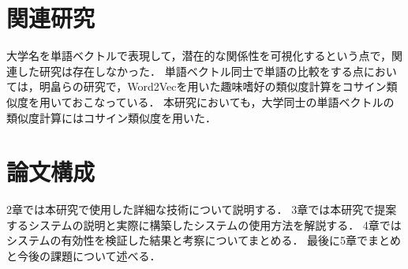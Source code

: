 \section{関連研究}
大学名を単語ベクトルで表現して，潜在的な関係性を可視化するという点で，関連した研究は存在しなかった．
単語ベクトル同士で単語の比較をする点においては，明畠ら\cite{thesis1}の研究で，Word2Vecを用いた趣味嗜好の類似度計算をコサイン類似度を用いておこなっている．
本研究においても，大学同士の単語ベクトルの類似度計算にはコサイン類似度を用いた．

\section{論文構成}
2章では本研究で使用した詳細な技術について説明する．
3章では本研究で提案するシステムの説明と実際に構築したシステムの使用方法を解説する．
4章ではシステムの有効性を検証した結果と考察についてまとめる．
最後に5章でまとめと今後の課題について述べる．
